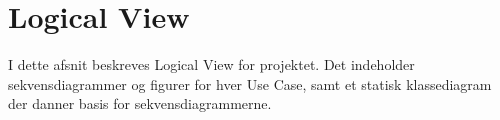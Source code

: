 \documentclass[Main]{subfiles}
\begin{document}
\newpage
\section{Logical View}
I dette afsnit beskreves Logical View for projektet.
Det indeholder sekvensdiagrammer og figurer for hver Use Case, samt et statisk klassediagram der danner basis for sekvensdiagrammerne.




\newpage

\end{document}
